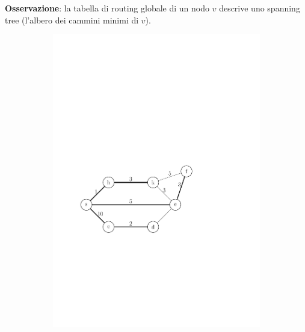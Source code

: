\documentclass[10pt,xcolor=dvipsnames]{beamer}
\begin{document}
\begin{frame}
	\frametitle{}
	\textbf{Osservazione}: la tabella di routing globale di un nodo $v$ descrive uno spanning tree
	(l'albero dei cammini minimi di $v$).
	
	\begin{figure}[h]
	\centering
		\begin{subfigure}[b]{0.35\textwidth}
			\includegraphics[scale=0.47]{routing_table_graph_tree.pdf}
		\end{subfigure}
		\begin{subfigure}[b]{0.6\textwidth}

\end{subfigure}
\end{figure}
\end{frame}
\end{document}
